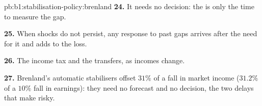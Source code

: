 \begin{solution}{pb:b1:stabilisation-policy:brenland}
\textbf{24.} It needs no decision: the  is only the time to
measure the gap.

\textbf{25.} When shocks do not persist, any response to past gaps arrives
after the need for it and adds to the loss.

\textbf{26.} The income tax and the transfers, as incomes change.

\textbf{27.} Brenland's automatic stabilisers offset $31\%$ of a fall in market
income ($31.2\%$ of a $10\%$ fall in earnings): they need no forecast and no
decision, the two delays that make  risky.
\end{solution}
